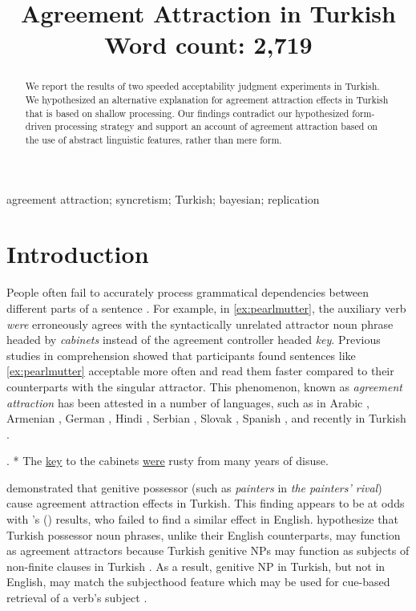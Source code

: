 \documentclass[brill,linguex]{glossa}\usepackage[]{graphicx}\usepackage[]{color}
\title[Agreement Attraction in Turkish]{Agreement Attraction in Turkish\\ \bigskip \large Word count: 2,719}
\author[A.B. \& C.D.]%
{%
  \spauthor{\texttt{Hidden Hidden (A.B.)}\\ 
  \institute{\texttt{Hidden University}}\\
  \small{
    \texttt{hidden@hidden.edu}}
  }
  \AND
  \spauthor{\texttt{Hidden Hidden (C.D.)}\\ 
  \institute{\texttt{Hidden University}}\\
  \small{
    \texttt{hidden@hidden.edu}}
  }%
}
\begin{document}
\sffamily
\maketitle


\begin{abstract}
We report the results of two speeded acceptability judgment experiments in Turkish. We hypothesized an alternative explanation for agreement attraction effects in Turkish that is based on shallow processing. Our findings contradict our hypothesized form-driven processing strategy and support an account of agreement attraction based on the use of abstract linguistic features, rather than mere form.
\end{abstract}

\begin{keywords}
  agreement attraction; syncretism; Turkish; bayesian; replication
\end{keywords}

\rmfamily


\section{Introduction}

People often fail to accurately process grammatical dependencies between different parts of a sentence \citep[e.g.,][]{GibsonThomas:1999,PhillipsEtAl:2011}. For example, in \ref{ex:pearlmutter}, the auxiliary verb \textit{were} erroneously agrees with the syntactically unrelated attractor noun phrase headed by \textit{cabinets} instead of the agreement controller headed \textit{key}. Previous  studies in comprehension \citep{NicolEtAl:1997, PearlmutterGarnseyBock:1999} showed that participants found sentences like \ref{ex:pearlmutter} acceptable more often and read them faster compared to their counterparts with the singular attractor. This phenomenon, known as \textit{agreement attraction} \citep{BockMiller:1991} has been attested in a number of languages, such as in Arabic \citep{TuckerEtAl:2015}, Armenian \citep{AvetisyanEtAl:2020}, German \citep{LagoFelser:2018}, Hindi \citep{BhatiaDillon:2020}, Serbian \citep{RisticEtAl:2016}, Slovak \citep{BadeckerKuminiak:2007}, Spanish \citep{LagoEtAl:2015}, and recently in Turkish \citep{LagoEtAl:2019}.


\ex. \label{ex:pearlmutter} * The \underline{key} to the cabinets \underline{were} rusty from many years of disuse. 


\citet{LagoEtAl:2019} demonstrated that genitive possessor (such as \textit{painters} in \textit{the painters' rival}) cause agreement attraction effects in Turkish. This finding appears to be at odds with \citeauthor{NicolEtAl:2016}'s (\citeyear{NicolEtAl:2016}) results, who failed to find a similar effect in English. \citet{LagoEtAl:2019} hypothesize that Turkish possessor noun phrases, unlike their English counterparts, may function as agreement attractors because Turkish genitive NPs may function as subjects of non-finite clauses in Turkish \citep{GokselKerslake:2005,Kornfilt:2011}. As a result, genitive NP in Turkish, but not in English, may match the subjecthood feature which may be used for cue-based retrieval of a verb's subject \citep{LewisVasishth:2005, ArnettWagers:2017}.
\end{document}
